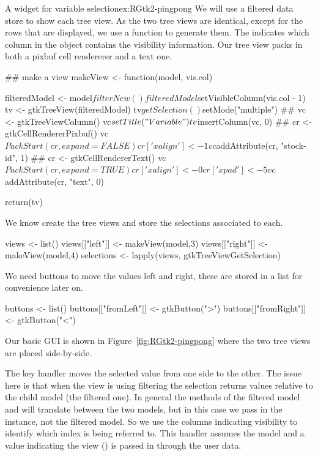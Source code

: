 \begin{example}{A widget for variable selection}{ex:RGtk2-pingpong}
We will use a filtered data store to show each tree view.
As the two tree views are identical, except for the rows that are
displayed, we use a function to generate them. The 
indicates which column in the  object contains the
visibility information. Our tree view packs in both a pixbuf cell
rendererer and a text one.
\begin{Schunk}
\begin{Sinput}
 ## make a view
 makeView <- function(model, vis.col) {
   filteredModel <- model$filterNew()
   filteredModel$setVisibleColumn(vis.col - 1)
   tv <- gtkTreeView(filteredModel)
   tv$getSelection()$setMode("multiple")
   ##
   vc <- gtkTreeViewColumn()
   vc$setTitle("Variable")
   tv$insertColumn(vc, 0)
   ##
   cr <- gtkCellRendererPixbuf()
   vc$PackStart(cr, expand=FALSE)
   cr['xalign'] <- 1
   vc$addAttribute(cr, "stock-id", 1)
   ##
   cr <- gtkCellRendererText()
   vc$PackStart(cr, expand=TRUE)
   cr['xalign'] <- 0
   cr['xpad'] <- 5
   vc$addAttribute(cr, "text", 0)
 
   return(tv)
 }
\end{Sinput}
\end{Schunk}
We know create the tree views and store the selections associated to each.
\begin{Schunk}
\begin{Sinput}
 views <- list()
 views[["left"]] <- makeView(model,3)
 views[["right"]] <- makeView(model,4)
 selections <- lapply(views, gtkTreeViewGetSelection)
\end{Sinput}
\end{Schunk}
We need buttons to move the values left and right, these are stored
in a list for convenience later on.
\begin{Schunk}
\begin{Sinput}
 buttons <- list()
 buttons[["fromLeft"]] <- gtkButton(">")
 buttons[["fromRight"]] <- gtkButton("<")
\end{Sinput}
\end{Schunk}

Our basic GUI is shown in Figure~\ref{fig:RGtk2-pingpong} where the
two tree views are placed side-by-side.

The key handler moves the selected value from one side to the
other. The issue here is that when the view is using filtering the
selection returns values relative to the child model (the filtered
one). In general the methods of the filtered model
 and  will
translate between the two models, but in this case we pass in the
 instance, not the filtered model. So we use the
columns indicating visibility to identify which index is being
referred to. This handler assumes the model and a value indicating the
view () is passed in through the user data.
\begin{Schunk}
\end{Schunk}
\end{example}
